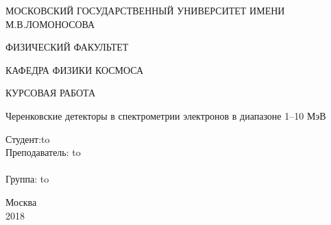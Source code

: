 \begin{titlepage}
	\fontsize{16}{20pt}\selectfont
	\newpage
	
	\begin{center}
		МОСКОВСКИЙ ГОСУДАРСТВЕННЫЙ УНИВЕРСИТЕТ ИМЕНИ М.В.ЛОМОНОСОВА
	\end{center}
	\vspace{2em}
	
	\begin{center}
ФИЗИЧЕСКИЙ ФАКУЛЬТЕТ
	\end{center}
	\vspace{1em}
	\begin{center}
		КАФЕДРА ФИЗИКИ КОСМОСА
	\end{center}
	\vspace{2em}
	
	\begin{center}
КУРСОВАЯ РАБОТА
	\end{center}
		
	\vspace{2em}
	\begin{center}
		Черенковские детекторы в спектрометрии электронов в диапазоне 1--10 МэВ
	\end{center}
	\vspace{8em}
	
	\newbox{\lbox}
	\newlength{\maxl}
	\setlength{\maxl}{\wd\lbox plus 1ex}
	\hfill\parbox{11cm}{
		\hspace*{2cm}\hspace*{-4cm}Студент:\hfill\hbox to\\
		\hspace*{2cm}\hspace*{-4cm}Преподаватель: \hfill\hbox to\\
		\\
		\hspace*{2cm}\hspace*{-4cm}Группа: \hfill\hbox to\\
	}
	\vspace{\fill}
	
	\begin{center}
		Москва \\2018
	\end{center}
	
	
\end{titlepage}